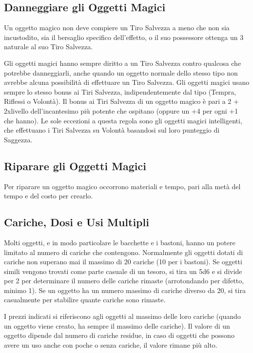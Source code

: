 \begin{multicols}{2}
\subsection{Danneggiare gli Oggetti Magici}

\label{danneggiare-gli-oggetti-magici}

Un oggetto magico non deve compiere un Tiro Salvezza a meno che non sia incustodito, sia il bersaglio specifico dell'effetto, o il suo possessore ottenga un 3 naturale al suo Tiro Salvezza.

Gli oggetti magici hanno sempre diritto a un Tiro Salvezza contro qualcosa che potrebbe danneggiarli, anche quando un oggetto normale dello stesso tipo non avrebbe alcuna possibilità di effettuare un Tiro Salvezza. Gli oggetti magici usano sempre lo stesso bonus ai Tiri Salvezza, indipendentemente dal tipo (Tempra, Riflessi o Volontà). Il bonus ai Tiri Salvezza di un oggetto magico è pari a 2 + 2xlivello dell'incantesimo più potente che ospitano (oppure un +4 per ogni +1 che hanno). Le sole eccezioni a questa regola sono gli oggetti magici intelligenti, che effettuano i Tiri Salvezza su Volontà basandosi sul loro punteggio di Saggezza.

\subsection{Riparare gli Oggetti Magici}
\label{riparare-gli-oggetti-magici}

Per riparare un oggetto magico occorrono materiali e tempo, pari alla metà del tempo e del costo per crearlo.

\subsection{Cariche, Dosi e Usi Multipli}

\label{cariche-dosi-e-usi-multipli}

Molti oggetti, e in modo particolare le bacchette e i bastoni, hanno un potere limitato al numero di cariche che contengono. Normalmente gli oggetti dotati di cariche non superano mai il massimo di 20 cariche (10 per i bastoni). Se oggetti simili vengono trovati come parte casuale di un tesoro, si tira un 5d6 e si divide per 2 per determinare il numero delle cariche rimaste (arrotondando per difetto, minimo 1). Se un oggetto ha un numero massimo di cariche diverso da 20, si tira casualmente per stabilire quante cariche sono rimaste.

I prezzi indicati si riferiscono agli oggetti al massimo delle loro cariche (quando un oggetto viene creato, ha sempre il massimo delle cariche). Il valore di un oggetto dipende dal numero di cariche residue, in caso di oggetti che possono avere un uso anche con poche o senza cariche, il valore rimane più alto.

\end{multicols}

